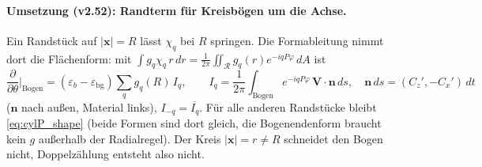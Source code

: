 \paragraph{Umsetzung (v2.52): Randterm für Kreisbögen um die Achse.}
Ein Randstück auf $|\mathbf x|=R$ lässt $\chi_q$ bei $R$ springen. Die Formableitung nimmt dort die Flächenform: mit
$\int g_q\chi_q\,r\,dr=\frac1{2\pi}\iint_{\mathcal R}g_q(r)e^{-iqP\varphi}\,dA$ ist
\[
  \frac{\partial}{\partial\theta}\Big|_{\text{Bogen}}=(\varepsilon_b-\varepsilon_{\text{bg}})\sum_qg_q(R)\,I_q,\qquad
  I_q=\frac1{2\pi}\int_{\text{Bogen}}e^{-iqP\varphi}\,\mathbf V\cdot\mathbf n\,ds,\quad\mathbf n\,ds=(C_z',-C_x')\,dt
\]
($\mathbf n$ nach außen, Material links), $I_{-q}=\overline{I_q}$. Für alle anderen Randstücke bleibt \eqref{eq:cylP_shape}
(beide Formen sind dort gleich, die Bogenendenform braucht kein $g$ außerhalb der Radialregel). Der Kreis $|\mathbf x|=r\ne R$
schneidet den Bogen nicht, Doppelzählung entsteht also nicht.
